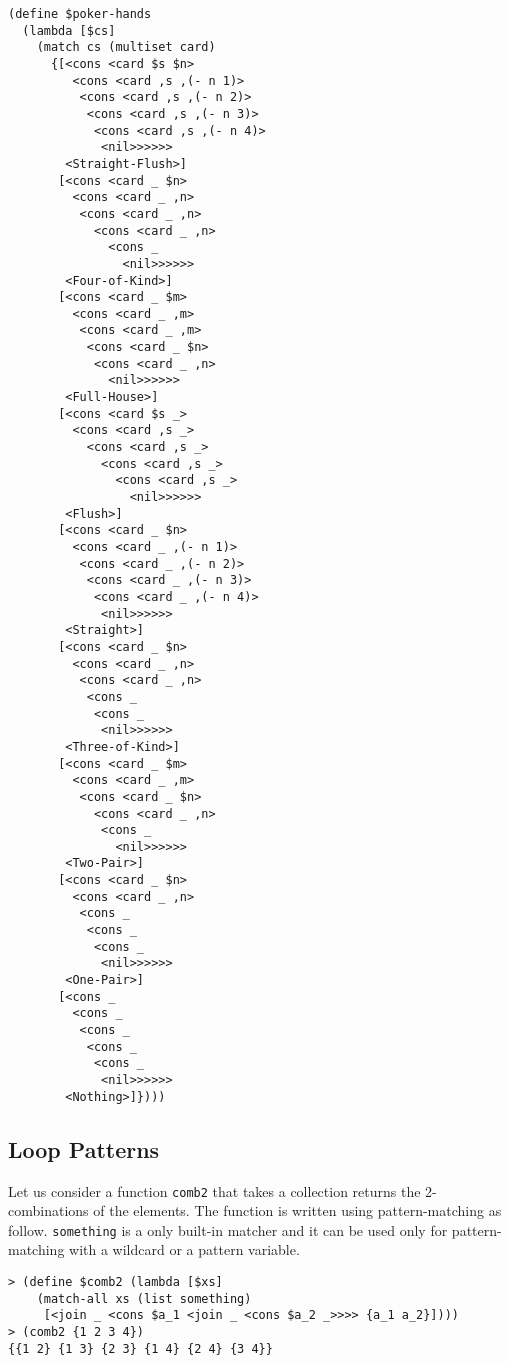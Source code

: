 \documentclass{article}
\begin{document}
\begin{multicols}{2}
{\scriptsize
\begin{verbatim}
(define $poker-hands
  (lambda [$cs]
    (match cs (multiset card)
      {[<cons <card $s $n>
         <cons <card ,s ,(- n 1)>
          <cons <card ,s ,(- n 2)>
           <cons <card ,s ,(- n 3)>
            <cons <card ,s ,(- n 4)>
             <nil>>>>>>
        <Straight-Flush>]
       [<cons <card _ $n>
         <cons <card _ ,n>
          <cons <card _ ,n>
            <cons <card _ ,n>
              <cons _
                <nil>>>>>>
        <Four-of-Kind>]
       [<cons <card _ $m>
         <cons <card _ ,m>
          <cons <card _ ,m>
           <cons <card _ $n>
            <cons <card _ ,n>
              <nil>>>>>>
        <Full-House>]
       [<cons <card $s _>
         <cons <card ,s _>
           <cons <card ,s _>
             <cons <card ,s _>
               <cons <card ,s _>
                 <nil>>>>>>
        <Flush>]
       [<cons <card _ $n>
         <cons <card _ ,(- n 1)>
          <cons <card _ ,(- n 2)>
           <cons <card _ ,(- n 3)>
            <cons <card _ ,(- n 4)>
             <nil>>>>>>
        <Straight>]
       [<cons <card _ $n>
         <cons <card _ ,n>
          <cons <card _ ,n>
           <cons _
            <cons _
             <nil>>>>>>
        <Three-of-Kind>]
       [<cons <card _ $m>
         <cons <card _ ,m>
          <cons <card _ $n>
            <cons <card _ ,n>
             <cons _
               <nil>>>>>>
        <Two-Pair>]
       [<cons <card _ $n>
         <cons <card _ ,n>
          <cons _
           <cons _
            <cons _
             <nil>>>>>>
        <One-Pair>]
       [<cons _
         <cons _
          <cons _
           <cons _
            <cons _
             <nil>>>>>>
        <Nothing>]})))
\end{verbatim}
  }
\end{multicols}

\subsection{Loop Patterns}

Let us consider a function \texttt{comb2} that takes a collection returns the 2-combinations of the elements.
The function is written using pattern-matching as follow.
\texttt{something} is a only built-in matcher and it can be used only for pattern-matching with a wildcard or a pattern variable.

{\footnotesize
\begin{verbatim}
> (define $comb2 (lambda [$xs]
    (match-all xs (list something)
     [<join _ <cons $a_1 <join _ <cons $a_2 _>>>> {a_1 a_2}])))
> (comb2 {1 2 3 4})
{{1 2} {1 3} {2 3} {1 4} {2 4} {3 4}}
\end{verbatim}
}
\end{document}
